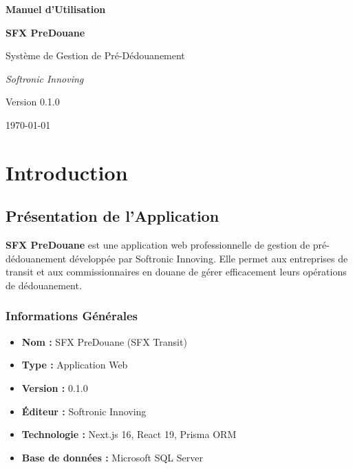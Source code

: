 \documentclass[12pt,a4paper]{report}
\begin{document}
\begin{titlepage}
    \centering
    \vspace*{2cm}
    {\Huge\bfseries Manuel d'Utilisation\par}
    \vspace{1cm}
    {\LARGE\bfseries SFX PreDouane\par}
    \vspace{0.5cm}
    {\Large Système de Gestion de Pré-Dédouanement\par}
    \vspace{2cm}
    \vspace{2cm}
    {\Large\itshape Softronic Innoving\par}
    \vfill
    {\large Version 0.1.0\par}
    {\large \today\par}
\end{titlepage}

\tableofcontents
\newpage

\chapter{Introduction}

\section{Présentation de l'Application}

\textbf{SFX PreDouane} est une application web professionnelle de gestion de pré-dédouanement développée par Softronic Innoving. Elle permet aux entreprises de transit et aux commissionnaires en douane de gérer efficacement leurs opérations de dédouanement.

\subsection{Informations Générales}

\begin{itemize}[leftmargin=*]
    \item \textbf{Nom :} SFX PreDouane (SFX Transit)
    \item \textbf{Type :} Application Web
    \item \textbf{Version :} 0.1.0
    \item \textbf{Éditeur :} Softronic Innoving
    \item \textbf{Technologie :} Next.js 16, React 19, Prisma ORM
    \item \textbf{Base de données :} Microsoft SQL Server
\end{itemize}
\end{document}
